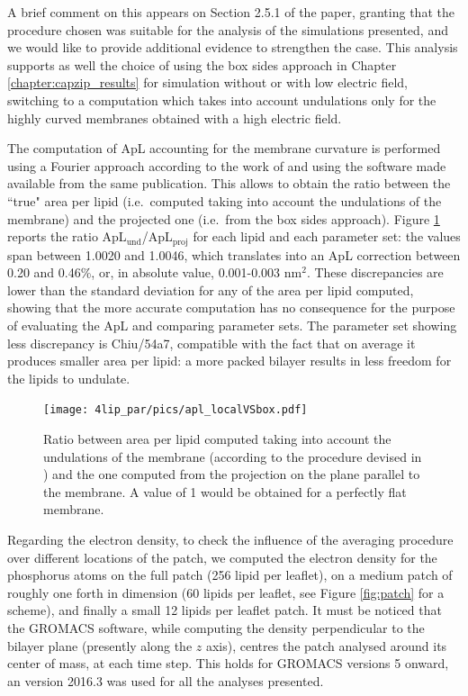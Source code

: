 A brief comment on this appears on Section 2.5.1 of the paper, granting that the procedure chosen was suitable for the analysis of the simulations presented, and we would like to provide additional evidence to strengthen the case.
%
This analysis supports as well the choice of using the box sides approach in Chapter \ref{chapter:capzip_results} for simulation without or with low electric field, switching to a computation which takes into account undulations only for the highly curved membranes obtained with a high electric field.

The computation of ApL accounting for the membrane curvature is performed using a Fourier approach according to the work of \citet{Braun2011} and using the software made available from the same publication.
%
This allows to obtain the ratio between the ``true" area per lipid (i.e.\ computed taking into account the undulations of the membrane) and the projected one (i.e.\ from the box sides approach).
%
Figure \ref{fig:apl_und} reports the ratio ApL$_{\text{und}}$/ApL$_{\text{proj}}$ for each lipid and each parameter set: the values span between 1.0020 and 1.0046, which translates into an ApL correction between 0.20 and 0.46\%, or, in absolute value, 0.001-0.003 nm$^2$.
%
These discrepancies are lower than the standard deviation for any of the area per lipid computed, showing that the more accurate computation has no consequence for the purpose of evaluating the ApL and comparing parameter sets.
%
The parameter set showing less discrepancy is Chiu/54a7, compatible with the fact that on average it produces smaller area per lipid: a more packed bilayer results in less freedom for the lipids to undulate.

\begin{figure}[h!]
	\centering
	\texttt{[image: 4lip\_par/pics/apl\_localVSbox.pdf]}
	\caption[Comparison between methods to compute ApL]{Ratio between area per lipid computed taking into account the undulations of the membrane (according to the procedure devised in \citet{Braun2011}) and the one computed from the projection on the plane parallel to the membrane. A value of 1 would be obtained for a perfectly flat membrane.}
	\label{fig:apl_und}
\end{figure}

Regarding the electron density, to check the influence of the averaging procedure over different locations of the patch, we computed the electron density for the phosphorus atoms on the full patch (256 lipid per leaflet), on a medium patch of roughly one forth in dimension (60 lipids per leaflet, see Figure \ref{fig:patch} for a scheme), and finally a small 12 lipids per leaflet patch. It must be noticed that the GROMACS software, while computing the density perpendicular to the bilayer plane (presently along the $z$ axis), centres the patch analysed around its center of mass, at each time step. This holds for GROMACS versions 5 onward, an version 2016.3 was used for all the analyses presented.

